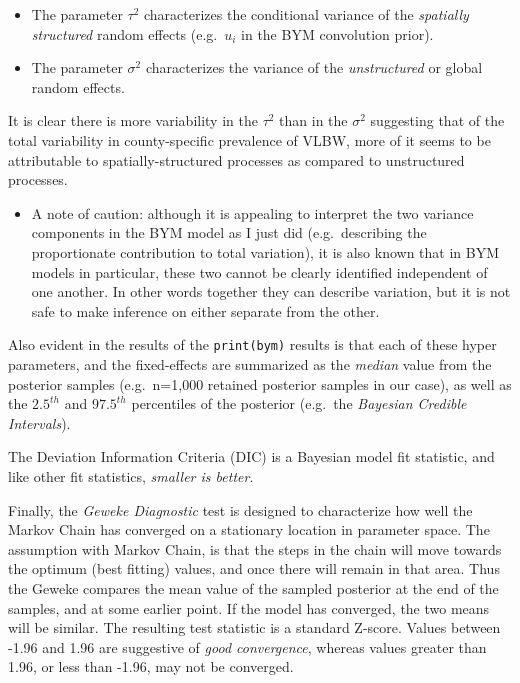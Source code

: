 \documentclass[
]{book}
\newcommand{\passthrough}[1]{#1}
\providecommand{\tightlist}{%
  \setlength{\itemsep}{0pt}\setlength{\parskip}{0pt}}
\newenvironment{rmdblock}[1]
  {%
  \begin{itemize}
  \renewcommand{\labelitemi}{
    \raisebox{-.7\height}[0pt][0pt]{
      {\setkeys{Gin}{width=3em,keepaspectratio}\texttt{[image: images/\#1]}}
    }
  }
  \item
  }
  {
  \end{itemize}
  }
\newenvironment{rmdcaution}
  {\begin{rmdblock}{caution}}
  {\end{rmdblock}}
\begin{document}
\begin{itemize}
\tightlist
\item
  The parameter \(\tau^2\) characterizes the conditional variance of the \emph{spatially structured} random effects (e.g.~\(u_i\) in the BYM convolution prior).
\item
  The parameter \(\sigma^2\) characterizes the variance of the \emph{unstructured} or global random effects.
\end{itemize}

It is clear there is more variability in the \(\tau^2\) than in the \(\sigma^2\) suggesting that of the total variability in county-specific prevalence of VLBW, more of it seems to be attributable to spatially-structured processes as compared to unstructured processes.

\begin{rmdcaution}
A note of caution: although it is appealing to interpret the two variance components in the BYM model as I just did (e.g.~describing the proportionate contribution to total variation), it is also known that in BYM models in particular, these two cannot be clearly identified independent of one another. In other words together they can describe variation, but it is not safe to make inference on either separate from the other.
\end{rmdcaution}

Also evident in the results of the \passthrough{\lstinline!print(bym)!} results is that each of these hyper parameters, and the fixed-effects are summarized as the \emph{median} value from the posterior samples (e.g.~n=1,000 retained posterior samples in our case), as well as the \(2.5^{th}\) and \(97.5^{th}\) percentiles of the posterior (e.g.~the \emph{Bayesian Credible Intervals}).

The Deviation Information Criteria (DIC) is a Bayesian model fit statistic, and like other fit statistics, \emph{smaller is better}.

Finally, the \emph{Geweke Diagnostic} test is designed to characterize how well the Markov Chain has converged on a stationary location in parameter space. The assumption with Markov Chain, is that the steps in the chain will move towards the optimum (best fitting) values, and once there will remain in that area. Thus the Geweke compares the mean value of the sampled posterior at the end of the samples, and at some earlier point. If the model has converged, the two means will be similar. The resulting test statistic is a standard Z-score. Values between -1.96 and 1.96 are suggestive of \emph{good convergence}, whereas values greater than 1.96, or less than -1.96, may not be converged.
\end{document}
